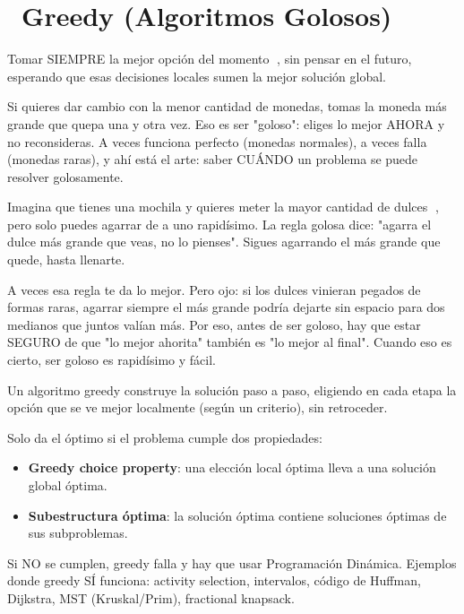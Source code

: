 \chapter[\emj{🤑}~Greedy (Algoritmos Golosos)]{~Greedy (Algoritmos Golosos)}

\begin{dsaquees}

Tomar SIEMPRE la mejor opción del momento 🍰, sin pensar en el futuro,
esperando que esas decisiones locales sumen la mejor solución global.

Si quieres dar cambio con la menor cantidad de monedas, tomas la moneda
más grande que quepa una y otra vez. Eso es ser "goloso": eliges lo mejor
AHORA y no reconsideras. A veces funciona perfecto (monedas normales),
a veces falla (monedas raras), y ahí está el arte: saber CUÁNDO un
problema se puede resolver golosamente.

\end{dsaquees}

\begin{dsanino}

Imagina que tienes una mochila y quieres meter la mayor cantidad de
dulces 🍬, pero solo puedes agarrar de a uno rapidísimo. La regla golosa
dice: "agarra el dulce más grande que veas, no lo pienses". Sigues
agarrando el más grande que quede, hasta llenarte.

A veces esa regla te da lo mejor. Pero ojo: si los dulces vinieran
pegados de formas raras, agarrar siempre el más grande podría dejarte sin
espacio para dos medianos que juntos valían más. Por eso, antes de ser
goloso, hay que estar SEGURO de que "lo mejor ahorita" también es "lo
mejor al final". Cuando eso es cierto, ser goloso es rapidísimo y fácil.

\end{dsanino}

\begin{dsaotraforma}

Un algoritmo greedy construye la solución paso a paso, eligiendo en cada
etapa la opción que se ve mejor localmente (según un criterio), sin
retroceder.

Solo da el óptimo si el problema cumple dos propiedades:
\begin{itemize}
\item \textbf{Greedy choice property}: una elección local óptima lleva a
      una solución global óptima.
\item \textbf{Subestructura óptima}: la solución óptima contiene
      soluciones óptimas de sus subproblemas.
\end{itemize}

Si NO se cumplen, greedy falla y hay que usar Programación Dinámica.
Ejemplos donde greedy SÍ funciona: activity selection, intervalos,
código de Huffman, Dijkstra, MST (Kruskal/Prim), fractional knapsack.

\end{dsaotraforma}

